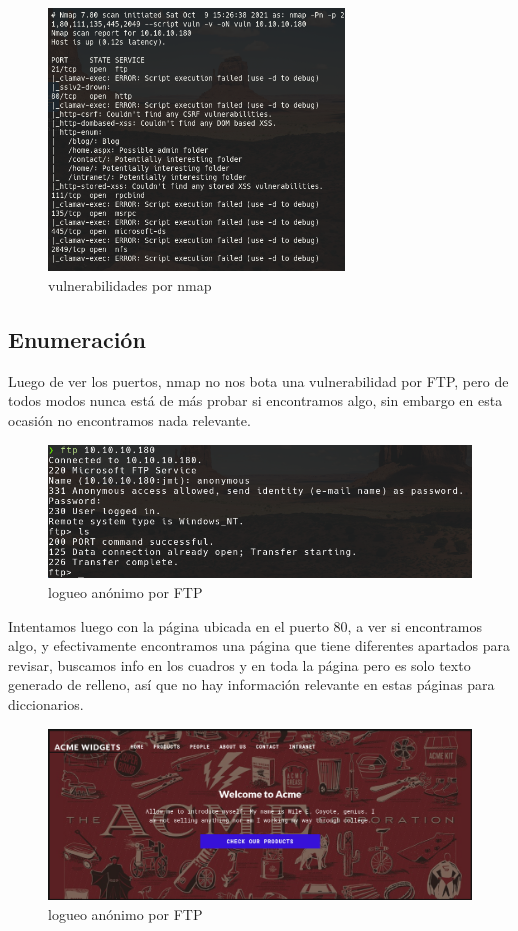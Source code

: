 \documentclass{article}
\begin{document}
\begin{figure}[h]
	\center
	\includegraphics[width=0.7\textwidth]{images/remote/nmap_vuln.png}
	\caption{vulnerabilidades por nmap}
\end{figure}
\subsection{Enumeración}

Luego de ver los puertos, nmap no nos bota una vulnerabilidad por FTP, pero de todos modos nunca está de más probar si encontramos algo, sin embargo en esta ocasión no encontramos nada relevante.
\begin{figure}[h!]
	\center 
	\includegraphics[width=\textwidth]{images/remote/ftp.png}
	\caption{logueo anónimo por FTP}
\end{figure}

Intentamos luego con la página ubicada en el puerto 80, a ver si encontramos algo, y efectivamente encontramos una página que tiene diferentes apartados para revisar, buscamos info en los cuadros y en toda la página pero es solo texto generado de relleno, así que no hay información relevante en estas páginas para diccionarios.
\begin{figure}[h!]
	\center 
	\includegraphics[width=\textwidth]{images/remote/index_pagina.png}
	\caption{logueo anónimo por FTP}
\end{figure}
\end{document}
